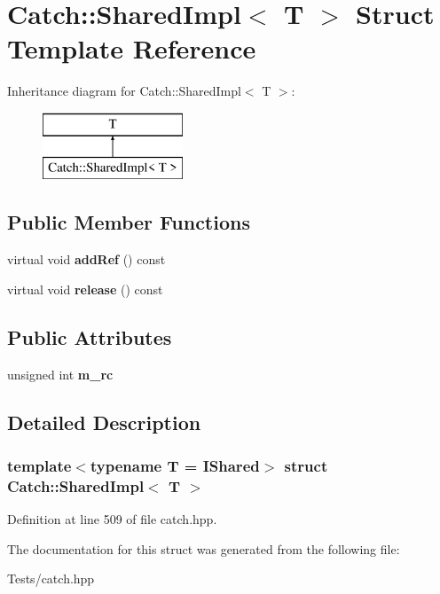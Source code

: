 \hypertarget{struct_catch_1_1_shared_impl}{}\section{Catch\+:\+:Shared\+Impl$<$ T $>$ Struct Template Reference}
\label{struct_catch_1_1_shared_impl}
Inheritance diagram for Catch\+:\+:Shared\+Impl$<$ T $>$\+:\begin{figure}[H]
\begin{center}
\leavevmode
\includegraphics[height=2.000000cm]{struct_catch_1_1_shared_impl}
\end{center}
\end{figure}
\subsection*{Public Member Functions}
\begin{DoxyCompactItemize}
\item 
\mbox{\label{struct_catch_1_1_shared_impl_a5d1a4c96e8fc07c821890fd09749062e}} 
virtual void {\bfseries add\+Ref} () const
\item 
\mbox{\label{struct_catch_1_1_shared_impl_ada8052c6f24fd73ec099333626f106fe}} 
virtual void {\bfseries release} () const
\end{DoxyCompactItemize}
\subsection*{Public Attributes}
\begin{DoxyCompactItemize}
\item 
\mbox{\label{struct_catch_1_1_shared_impl_a7e71ef1985b85aa41a1632f932a96bcb}} 
unsigned int {\bfseries m\+\_\+rc}
\end{DoxyCompactItemize}


\subsection{Detailed Description}
\subsubsection*{template$<$typename T = I\+Shared$>$\newline
struct Catch\+::\+Shared\+Impl$<$ T $>$}



Definition at line 509 of file catch.\+hpp.



The documentation for this struct was generated from the following file\+:\begin{DoxyCompactItemize}
\item 
Tests/catch.\+hpp\end{DoxyCompactItemize}
